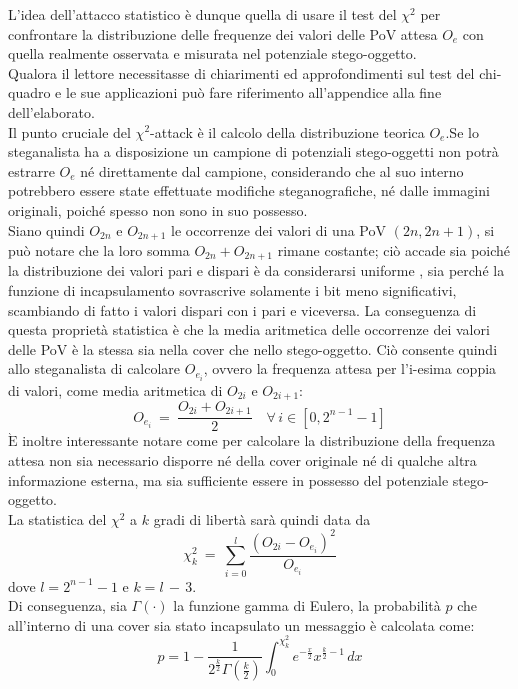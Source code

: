 L'idea dell'attacco statistico è dunque quella di usare il test del $\chi^2$ per confrontare la distribuzione delle frequenze dei valori delle PoV attesa $O_e$ con quella realmente osservata e misurata nel potenziale stego-oggetto.\\Qualora il lettore necessitasse di chiarimenti ed approfondimenti sul test del chi-quadro e le sue applicazioni può fare riferimento all'appendice alla fine dell'elaborato.\\Il punto cruciale del $\chi^2$-attack è il calcolo della distribuzione teorica $O_e$.\newpage \noindent Se lo steganalista ha a disposizione un campione di potenziali stego-oggetti non potrà estrarre $O_e$ né direttamente dal campione, considerando che al suo interno potrebbero essere state effettuate modifiche steganografiche, né dalle immagini originali, poiché spesso non sono in suo possesso.\\Siano quindi $O_{2n}$ e $O_{2n+1}$ le occorrenze dei valori di una PoV $(2n, 2n +1)$, si può notare che la loro somma $O_{2n} + O_{2n+1}$ rimane costante; ciò accade sia poiché la distribuzione dei valori pari e dispari è da considerarsi uniforme \cite{survey2}, sia perché la funzione di incapsulamento sovrascrive solamente i bit meno significativi, scambiando di fatto i valori dispari con i pari e viceversa. La conseguenza di questa proprietà statistica è che la media aritmetica delle occorrenze dei valori delle PoV è la stessa sia nella cover che nello stego-oggetto. Ciò consente quindi allo steganalista di calcolare $O_{e_i}$, ovvero la frequenza attesa per l'i-esima coppia di valori, come media aritmetica di $O_{2i}$ e $O_{2i+1}$:
\[O_{e_i} \: = \: \frac{O_{2i} + O_{2i+1}}{2} \quad \forall \, i \in [0, 2^{n-1}-1]\]
$\mathrm{\grave{E}}$ inoltre interessante notare come per calcolare la distribuzione della frequenza attesa non sia necessario disporre né della cover originale né di qualche altra informazione esterna, ma sia sufficiente essere in possesso del potenziale stego-oggetto.
\\La statistica del $\chi^2$ a $k$ gradi di libertà sarà quindi data da 
\[\chi^{2}_{k} \: = \: \sum_{i=0}^{l} \frac{(O_{2i} - O_{e_i})^2}{ O_{e_i}}\]
dove $l =  2^{n-1}-1$ e $k = l \, - \, 3 $.
\\Di conseguenza, sia $\Gamma(\cdot)$ la funzione gamma di Eulero, la probabilità $p$ che all'interno di una cover sia stato incapsulato un messaggio è calcolata come:
\[p =  1 - \frac{1}{2^{\frac{k}{2}}\Gamma (\frac{k}{2})}\int_{0}^{\chi^{2}_{k}}e^{-\frac{x}{2}}x^{\frac{k}{2}-1}\, dx \]
